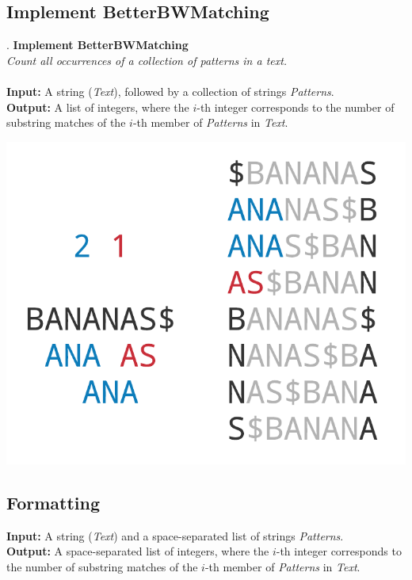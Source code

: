 \documentclass{article}
\renewcommand{\sc}[1]{\text{\scshape #1}}
\begin{document}
\subsection{Implement BetterBWMatching}.
\hline\vspace{5}
\noindent\textbf{Implement BetterBWMatching}\\
\emph{Count all occurrences of a collection of patterns in a text.}\\ \\
\textbf{Input:} A string \sc{BWT}(\emph{Text}), followed by a collection of strings \emph{Patterns}.\\
\textbf{Output:} A list of integers, where the $i$-th integer corresponds to the number of substring matches of the $i$-th member of \emph{Patterns} in \emph{Text}.
\begin{center}
    \includegraphics[scale=0.2]{c9/logos/9LM.png} 
\end{center}
\hline\vspace{5}

\subsection*{Formatting}
\textbf{Input:} A string \sc{BWT}(\emph{Text}) and a space-separated list of strings \emph{Patterns}.\\
\noindent\textbf{Output:} A space-separated list of integers, where the $i$-th integer corresponds to the number of substring matches of the $i$-th member of \emph{Patterns} in \emph{Text}.
\end{document}
